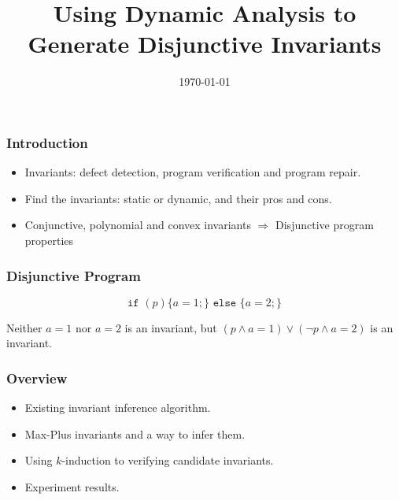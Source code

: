 \documentclass[11pt]{beamer}
\title{Using Dynamic Analysis to Generate Disjunctive Invariants}
\date{\today}
\begin{document}
\maketitle
\begin{frame}\frametitle{Introduction}
\begin{itemize}
\item Invariants: defect detection, program verification and program repair.

\item Find the invariants: static or dynamic, and their pros and cons.

\item Conjunctive, polynomial and convex invariants $\Rightarrow$ Disjunctive program properties

\end{itemize}

\end{frame}
\begin{frame}\frametitle{Disjunctive Program}
\begin{example}
\[\texttt{if }(p)\{a = 1;\}\texttt{ else }\{a=2;\}\]
\end{example}
Neither $a = 1$ nor $a = 2$ is an invariant, but $(p \wedge a = 1)\vee (\neg p \wedge a = 2)$ is an invariant.
\end{frame}
\begin{frame}\frametitle{Overview}
\begin{itemize}
\item Existing invariant inference algorithm.


\item Max-Plus invariants and a way to infer them.


\item Using $k$-induction to verifying candidate invariants.


\item Experiment results.

\end{itemize}
\end{frame}
\end{document}
